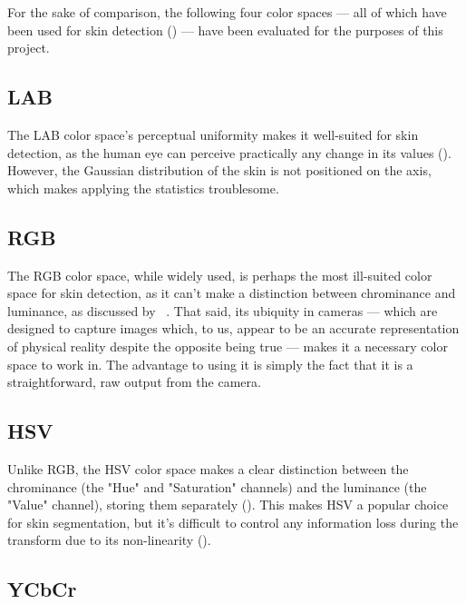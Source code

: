 For the sake of comparison, the following four color spaces --- all of which have been used for skin detection (\cite{Vezhnevets2003,Zarit1999a,Yang1997a,Brand2000a,Sigal2000a,Chai2000a,Phung2002a}) --- have been evaluated for the purposes of this project.

\subsection{LAB}\label{sec:LAB}

The LAB color space's perceptual uniformity makes it well-suited for skin detection, as the human eye can perceive practically any change in its values (\cite{Vezhnevets2003,Poynton1997}). However, the Gaussian distribution of the skin is not positioned on the axis, which makes applying the statistics troublesome.

\subsection{RGB}\label{sec:RGB}

The RGB color space, while widely used, is perhaps the most ill-suited color space for skin detection, as it can't make a distinction between chrominance and luminance, as discussed by ~\cite{Vezhnevets2003,Brand2000a}. That said, its ubiquity in cameras --- which are designed to capture images which, to us, appear to be an accurate representation of physical reality despite the opposite being true --- makes it a necessary color space to work in. The advantage to using it is simply the fact that it is a straightforward, raw output from the camera.

\subsection{HSV}\label{sec:HSV}

Unlike RGB, the HSV color space makes a clear distinction between the chrominance (the "Hue" and "Saturation" channels) and the luminance (the "Value" channel), storing them separately (\cite{Vezhnevets2003,Sigal2000a}). This makes HSV a popular choice for skin segmentation, but it's difficult to control any information loss during the transform due to its non-linearity (\cite{Poynton1997}).

\subsection{YCbCr}\label{sec:YCbCr}

